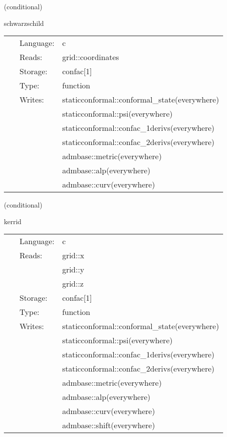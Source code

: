 \documentclass{article}
\begin{document}
   (conditional) 

\hspace{5mm} schwarzschild 

\hspace{5mm}{\it construct initial data for a single schwarzschild black hole } 


\hspace{5mm}

 \begin{tabular*}{160mm}{cll} 
~ & Language:  & c \\ 
~ & Reads:  & grid::coordinates \\ 
~ & Storage:  & confac[1] \\ 
~ & Type:  & function \\ 
~ & Writes:  & staticconformal::conformal\_state(everywhere) \\ 
~& ~ &staticconformal::psi(everywhere)\\ 
~& ~ &staticconformal::confac\_1derivs(everywhere)\\ 
~& ~ &staticconformal::confac\_2derivs(everywhere)\\ 
~& ~ &admbase::metric(everywhere)\\ 
~& ~ &admbase::alp(everywhere)\\ 
~& ~ &admbase::curv(everywhere)\\ 
\end{tabular*} 


\vspace{5mm}

   (conditional) 

\hspace{5mm} kerrid 

\hspace{5mm}{\it construct initial data for a single kerr black hole } 


\hspace{5mm}

 \begin{tabular*}{160mm}{cll} 
~ & Language:  & c \\ 
~ & Reads:  & grid::x \\ 
~& ~ &grid::y\\ 
~& ~ &grid::z\\ 
~ & Storage:  & confac[1] \\ 
~ & Type:  & function \\ 
~ & Writes:  & staticconformal::conformal\_state(everywhere) \\ 
~& ~ &staticconformal::psi(everywhere)\\ 
~& ~ &staticconformal::confac\_1derivs(everywhere)\\ 
~& ~ &staticconformal::confac\_2derivs(everywhere)\\ 
~& ~ &admbase::metric(everywhere)\\ 
~& ~ &admbase::alp(everywhere)\\ 
~& ~ &admbase::curv(everywhere)\\ 
~& ~ &admbase::shift(everywhere)\\ 
\end{tabular*} 
\end{document}
